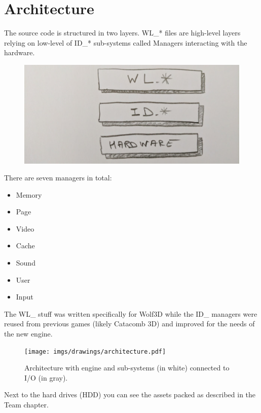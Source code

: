 \documentclass[book.tex]{subfiles}
\begin{document}
\section{Architecture}

The source code is structured in two layers. WL\_* files are high-level layers relying on low-level of ID\_* sub-systems called Managers interacting with the hardware.\\
\par
 \par
\begin{figure}[H]
\centering
 \includegraphics[width=\textwidth]{imgs/drawings/layers.png}
 \end{figure}
 \par
\par
There are seven managers in total:\\
\begin{itemize}
	\item Memory
	\item Page
	\item Video
	\item Cache
	\item Sound
	\item User
	\item Input
\end{itemize}
The WL\_ stuff was written specifically for Wolf3D while the ID\_ managers were reused from previous games (likely Catacomb 3D) and improved for the needs of the new engine.

\begin{figure}[H]
\centering
\texttt{[image: imgs/drawings/architecture.pdf]}
\caption{Architecture with engine and sub-systems (in white) connected to I/O (in gray).}
\label{fig:architecture}
\end{figure}
Next to the hard drives (HDD) you can see the assets packed as described in the Team chapter.
\end{document}
